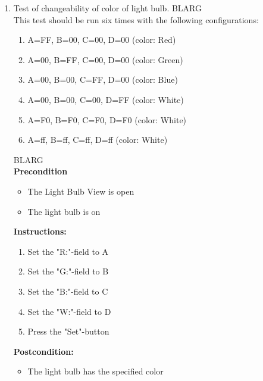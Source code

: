 \documentclass[a4paper]{article}
\newlength{\testlabellength}
\newenvironment{testlist}{\begin{enumerate}[label=\bfseries Instruction \thesubsection.\arabic* , labelindent=0pt, labelwidth=\testlabellength , leftmargin=2cm]}{\end{enumerate}}
\newenvironment{config}[1][2]{
{\color{white}BLARG}\\ 
This test should be run #1 times with the following configurations:
\begin{enumerate}[label=\bfseries  \arabic*., labelindent=0cm, labelwidth=2cm , leftmargin=1cm]
}
{\end{enumerate}}
\newenvironment{precondition}{
{\color{white}BLARG}\\ 
\textbf{Precondition}
\begin{itemize}[labelindent=0cm, labelwidth=2cm , leftmargin=1cm]
}
{\end{itemize}}
\newenvironment{instruction}{
\textbf{Instructions:}
\begin{enumerate}[label=\bfseries  \arabic*., labelindent=0cm, labelwidth=2cm , leftmargin=1cm]
}
{\end{enumerate}}
\newenvironment{postcondition}{
\textbf{Postcondition:}
\begin{itemize}[labelindent=0cm, labelwidth=2cm , leftmargin=1cm]
}
{\end{itemize}}
\begin{document}
\begin{appendices}
\begin{testlist}
	\item Test of changeability of color of light bulb.
		\begin{config}[six]
			\item A=FF, B=00, C=00, D=00 (color: Red)
			\item A=00, B=FF, C=00, D=00 (color: Green)
			\item A=00, B=00, C=FF, D=00 (color: Blue)
			\item A=00, B=00, C=00, D=FF (color: White)
			\item A=F0, B=F0, C=F0, D=F0 (color: White)
			\item A=ff, B=ff, C=ff, D=ff (color: White)
		\end{config}
		\begin{precondition}
			\item The Light Bulb View is open
			\item The light bulb is on
		\end{precondition}
		\begin{instruction}
			\item Set the "R:"-field to A
			\item Set the "G:"-field to B
			\item Set the "B:"-field to C
			\item Set the "W:"-field to D
			\item Press the "Set"-button
		\end{instruction}
		\begin{postcondition}
			\item The light bulb has the specified color
		\end{postcondition}
		


\end{testlist}
\end{appendices}
\end{document}
